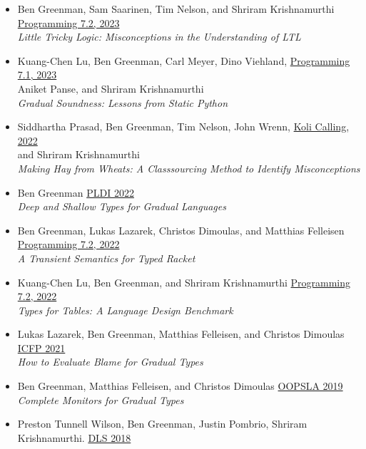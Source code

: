 \documentclass[11pt]{article}
\begin{document}
\begin{itemize}
\item
  Ben Greenman, Sam Saarinen, Tim Nelson, and Shriram Krishnamurthi \hfill \href{https://2023.programming-conference.org/}{Programming 7.2, 2023} \\
  \emph{Little Tricky Logic: Misconceptions in the Understanding of LTL}
\item
  Kuang-Chen Lu, Ben Greenman, Carl Meyer, Dino Viehland, \hfill \href{https://2023.programming-conference.org/}{Programming 7.1, 2023} \\
  Aniket Panse, and Shriram Krishnamurthi \\
  \emph{Gradual Soundness: Lessons from Static Python}
\item
  Siddhartha Prasad, Ben Greenman, Tim Nelson, John Wrenn, \hfill \href{https://www.kolicalling.fi/}{Koli Calling, 2022} \\
  and Shriram Krishnamurthi \\
  \emph{Making Hay from Wheats: A Classsourcing Method to Identify Misconceptions}
\item
  Ben Greenman \hfill \href{https://pldi22.sigplan.org/}{PLDI 2022} \\
  \emph{Deep and Shallow Types for Gradual Languages}
\item
  Ben Greenman, Lukas Lazarek, Christos Dimoulas, and Matthias Felleisen \hfill \href{https://2022.programming-conference.org/}{Programming 7.2, 2022} \\
  \emph{A Transient Semantics for Typed Racket}
\item
  Kuang-Chen Lu, Ben Greenman, and Shriram Krishnamurthi \hfill \href{https://2022.programming-conference.org/}{Programming 7.2, 2022} \\
  \emph{Types for Tables: A Language Design Benchmark}
\item
  Lukas Lazarek, Ben Greenman, Matthias Felleisen, and Christos Dimoulas \hfill \href{https://icfp21.sigplan.org/}{ICFP 2021} \\
  \emph{How to Evaluate Blame for Gradual Types}
\item
  Ben Greenman, Matthias Felleisen, and Christos Dimoulas \hfill \href{https://conf.researchr.org/track/splash-2019/splash-2019-OOPSLA}{OOPSLA 2019} \\
  \emph{Complete Monitors for Gradual Types}
\item
  Preston Tunnell Wilson, Ben Greenman, Justin Pombrio, Shriram Krishnamurthi. \hfill \href{https://conf.researchr.org/track/dls-2018/dls-2018}{DLS 2018} \\

\end{itemize}
\end{document}
